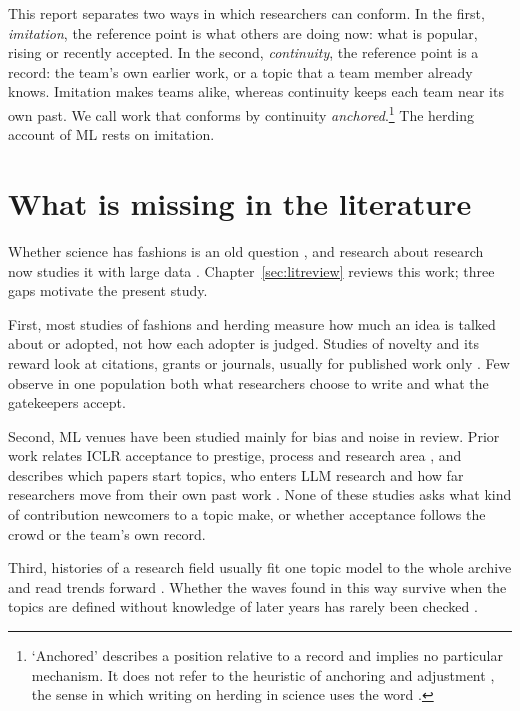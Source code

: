 This report separates two ways in which researchers can conform. In the first, \emph{imitation}, the reference point is
what others are doing now: what is popular, rising or recently accepted. In the second, \emph{continuity}, the
reference point is a record: the team's own earlier work, or a topic that a team member already knows. Imitation makes
teams alike, whereas continuity keeps each team near its own past. We call work that conforms by continuity
\emph{anchored}.\footnote{`Anchored' describes a position relative to a record and implies no particular mechanism. It
does not refer to the heuristic of anchoring and adjustment \citep{tversky1974judgment}, the sense in which writing on
herding in science uses the word \citep{baddeley2015herding}.} The herding account of ML rests on imitation.

\section{What is missing in the literature}

Whether science has fashions is an old question \citep{crane1969fashion}, and research about research now studies it
with large data \citep{fortunato2018science}. Chapter~\ref{sec:litreview} reviews this work; three gaps motivate the
present study.

First, most studies of fashions and herding measure how much an idea is talked about or adopted, not how each adopter
is judged. Studies of novelty and its reward look at citations, grants or journals, usually for published work only
\citep{foster2015tradition,uzzi2013atypical,boudreau2016looking}. Few observe in one population both what researchers
choose to write and what the gatekeepers accept.

Second, ML venues have been studied mainly for bias and noise in review. Prior work relates ICLR acceptance to
prestige, process and research area \citep{tran2020open,sun2022does,ibrahim2026bias,jung2025what,wang2023what,
xu2026reviewer}, and describes which papers start topics, who enters LLM research and how far researchers move from
their own past work \citep{huang2026catalyst,movva2024topics,bao2025persistence}. None of these studies asks what kind
of contribution newcomers to a topic make, or whether acceptance follows the crowd or the team's own record.

Third, histories of a research field usually fit one topic model to the whole archive and read trends forward
\citep{hall2008studying,anderson2012towards}. Whether the waves found in this way survive when the topics are defined
without knowledge of later years has rarely been checked \citep{rotolo2015what,li2025evaluation}.

